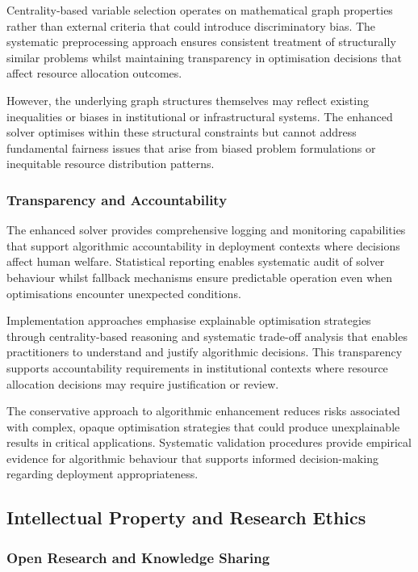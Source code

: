 Centrality-based variable selection operates on mathematical graph properties rather than external criteria that could introduce discriminatory bias. The systematic preprocessing approach ensures consistent treatment of structurally similar problems whilst maintaining transparency in optimisation decisions that affect resource allocation outcomes.

However, the underlying graph structures themselves may reflect existing inequalities or biases in institutional or infrastructural systems. The enhanced solver optimises within these structural constraints but cannot address fundamental fairness issues that arise from biased problem formulations or inequitable resource distribution patterns.

\subsubsection{Transparency and Accountability}

The enhanced solver provides comprehensive logging and monitoring capabilities that support algorithmic accountability in deployment contexts where decisions affect human welfare. Statistical reporting enables systematic audit of solver behaviour whilst fallback mechanisms ensure predictable operation even when optimisations encounter unexpected conditions.

Implementation approaches emphasise explainable optimisation strategies through centrality-based reasoning and systematic trade-off analysis that enables practitioners to understand and justify algorithmic decisions. This transparency supports accountability requirements in institutional contexts where resource allocation decisions may require justification or review.

The conservative approach to algorithmic enhancement reduces risks associated with complex, opaque optimisation strategies that could produce unexplainable results in critical applications. Systematic validation procedures provide empirical evidence for algorithmic behaviour that supports informed decision-making regarding deployment appropriateness.

\subsection{Intellectual Property and Research Ethics}

\subsubsection{Open Research and Knowledge Sharing}

